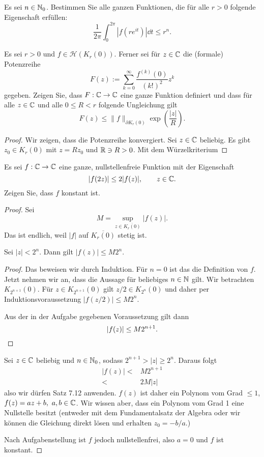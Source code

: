 \begin{Problem}
	Es sei $n\in \mathbb{N}_0$. Bestimmen Sie alle ganzen Funktionen, die für alle $r>0$ folgende Eigenschaft erfüllen:
	\[
		\frac{1}{2\pi}\int_0^{2\pi}|f(re^{it})|\dd{t}\le r^n
	.\] 
\end{Problem}

\begin{Problem}
	Es sei $r>0$ und $f\in \mathcal{H}(K_r(0)) $. Ferner sei für $z\in \mathbb{C}$ die (formale) Potenzreihe
	\[
		F(z):=\sum_{k=0}^{\infty} \frac{f^{(k)}(0)}{(k!)^2}z^k
	\]
	gegeben. Zeigen Sie, dass $F:\mathbb{C}\to \mathbb{C}$ eine ganze Funktion definiert und dass für alle $z\in \mathbb{C}$ und alle $0\le R < r$ folgende Ungleichung gilt
	\[
		F(z)\le \|f\|_{\partial K_r(0)}\exp\left( \frac{|z|}{R} \right) 
	.\] 
\end{Problem}
\begin{proof}
	Wir zeigen, dass die Potenzreihe konvergiert. Sei $z\in \mathbb{C}$ beliebig. Es gibt $z_0\in K_r(0)$ mit $z=Rz_0$ und $\mathbb{R}\ni R > 0$. Mit dem Würzelkriterium 
\end{proof}
\begin{Problem}
	Es sei $f:\mathbb{C}\to \mathbb{C}$ eine ganze, nullstellenfreie Funktion mit der Eigenschaft
	\[
	|f(2z)|\le 2|f(z)|,\qquad z\in \mathbb{C}
	.\] 
	Zeigen Sie, dass $f$ konstant ist.
\end{Problem}
\begin{proof}
	Sei
	\[
		M=\sup_{z\in \overline{K_r(0)}}|f(z)|
	.\] 
	Das ist endlich, weil $|f|$ auf $\overline{K_r(0)}$ stetig ist.
	\begin{Theorem}
		Sei $|z|<2^n$. Dann gilt $|f(z)|\le M 2^n$. 
	\end{Theorem}
	\begin{proof}
	Das beweisen wir durch Induktion. Für $n=0$ ist das die Definition von $f$. Jetzt nehmen wir an, dass die Aussage für beliebiges $n\in \mathbb{N}$ gilt. Wir betrachten $K_{2^{n+1}}(0)$. Für $z\in K_{2^{n+1}}(0)$ gilt $z / 2\in K_{2^n}(0)$ und daher per Induktionsvoraussetzung $|f(z / 2)|\le M 2^n$.

	Aus der in der Aufgabe gegebenen Voraussetzung gilt dann
	\[
		|f(z)| \le M 2^{n+1}
	.\qedhere\] 
\end{proof}
Sei $z\in \mathbb{C}$ beliebig und $n\in \mathbb{N}_0$, sodass $2^{n+1}>|z|\ge 2^n$. Daraus folgt
\begin{align*}
	|f(z)|<& M 2^{n+1}\\
	<& 2M|z|
\end{align*}
also wir dürfen Satz 7.12 anwenden. $f(z)$ ist daher ein Polynom vom Grad $\le 1$, $f(z)=az+b,~a,b\in \mathbb{C}$. Wir wissen aber, dass ein Polynom vom Grad 1 eine Nullstelle besitzt (entweder mit dem Fundamentalsatz der Algebra oder wir können die Gleichung direkt lösen und erhalten $z_0= - b / a$.)

Nach Aufgabenstellung ist $f$ jedoch nullstellenfrei, also $a=0$ und $f$ ist konstant.
\end{proof}
